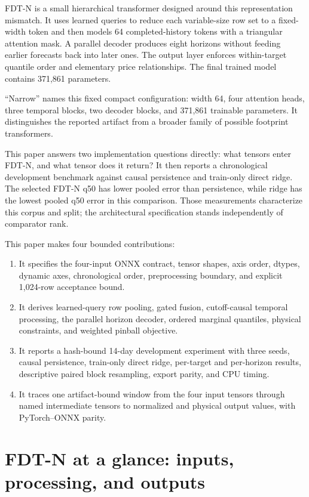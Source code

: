 \documentclass[10pt]{article}
\begin{document}
FDT-N is a small hierarchical transformer designed around this representation mismatch. It uses
learned queries to reduce each variable-size row set to a fixed-width token and then models 64
completed-history tokens with a triangular attention mask. A parallel decoder produces eight horizons without feeding earlier forecasts
back into later ones. The output layer enforces within-target quantile order and elementary price
relationships. The final trained model contains 371,861 parameters.

``Narrow'' names this fixed compact configuration: width 64, four attention heads, three temporal
blocks, two decoder blocks, and 371,861 trainable parameters. It distinguishes the reported artifact
from a broader family of possible footprint transformers.

This paper answers two implementation questions directly: what tensors enter FDT-N, and what tensor
does it return? It then reports a chronological development benchmark against causal persistence and
train-only direct ridge. The selected FDT-N q50 has lower pooled error than persistence, while ridge
has the lowest pooled q50 error in this comparison. Those measurements characterize this corpus and
split; the architectural specification stands independently of comparator rank.

This paper makes four bounded contributions:

\begin{enumerate}
  \item It specifies the four-input ONNX contract, tensor shapes, axis order, dtypes, dynamic axes,
  chronological order, preprocessing boundary, and explicit 1,024-row acceptance bound.
  \item It derives learned-query row pooling, gated fusion, cutoff-causal temporal processing, the
  parallel horizon decoder, ordered marginal quantiles, physical constraints, and weighted pinball objective.
  \item It reports a hash-bound 14-day development experiment with three seeds, causal persistence,
  train-only direct ridge, per-target and per-horizon results, descriptive paired block resampling,
  export parity, and CPU timing.
  \item It traces one artifact-bound window from the four input tensors through named intermediate
  tensors to normalized and physical output values, with PyTorch--ONNX parity.
\end{enumerate}

\section{FDT-N at a glance: inputs, processing, and outputs}
\end{document}

